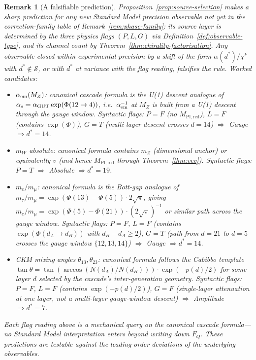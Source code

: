 \documentclass[12pt,a4paper]{article}
\newtheorem*{remark}{Remark}
\begin{document}
\begin{remark}[A falsifiable prediction]\label{rem:selection-falsifier}
Proposition~\ref{prop:source-selection} makes a sharp prediction for any new Standard Model precision observable not yet in the correction-family table of Remark~\ref{rem:phase-family}: its source layer is determined by the three physics flags $(P,L,G)$ via Definition~\ref{def:observable-type}, and its channel count by Theorem~\ref{thm:chirality-factorisation}. Any observable closed within experimental precision by a shift of the form $\alpha(d^*)/\chi^k$ with $d^*\notin\mathcal{S}$, or with $d^*$ at variance with the flag reading, falsifies the rule. Worked candidates:
\begin{itemize}
\item $\alpha_{\rm em}(M_Z)$: canonical cascade formula is the U(1)
descent analogue of $\alpha_s = \alpha_{\rm GUT}\exp(\Phi(12\to 4))$,
i.e.\ $\alpha_{\rm em}^{-1}$ at $M_Z$ is built from a U(1) descent
through the gauge window. Syntactic flags: $P = F$ (no
$M_{\mathrm{Pl,red}}$), $L = F$ (contains $\exp(\Phi)$),
$G = T$ (multi-layer descent crosses $d=14$) $\Rightarrow$ Gauge
$\Rightarrow d^* = 14$.
\item $m_W$ absolute: canonical formula contains $m_Z$ (dimensional
anchor) or equivalently $v$ (and hence $M_{\mathrm{Pl,red}}$ through
Theorem~\ref{thm:vev}). Syntactic flags: $P = T$ $\Rightarrow$
Absolute $\Rightarrow d^* = 19$.
\item $m_e/m_\mu$: canonical formula is the Bott-gap analogue of
$m_\tau/m_\mu = \exp(\Phi(13)-\Phi(5))\cdot 2\sqrt{\pi}$, giving
$m_e/m_\mu = \exp(\Phi(5)-\Phi(21))\cdot (2\sqrt{\pi})^{-1}$ or
similar path across the gauge window. Syntactic flags: $P = F$,
$L = F$ (contains $\exp(\Phi(d_A\to d_B))$ with $d_B - d_A \geq 2$),
$G = T$ (path from $d=21$ to $d=5$ crosses the gauge window
$\{12,13,14\}$) $\Rightarrow$ Gauge $\Rightarrow d^* = 14$.
\item CKM mixing angles $\theta_{13},\theta_{23}$: canonical formula
follows the Cabibbo template $\tan\theta =
\tan(\arccos(N(d_A)/N(d_B)))\cdot\exp(-p(d)/2)$ for some layer $d$
selected by the cascade's inter-generation geometry. Syntactic flags:
$P = F$, $L = F$ (contains $\exp(-p(d)/2)$), $G = F$
(single-layer attenuation at one layer, not a multi-layer gauge-window
descent) $\Rightarrow$ Amplitude $\Rightarrow d^* = 7$.
\end{itemize}
Each flag reading above is a mechanical query on the canonical
cascade formula---no Standard Model interpretation enters beyond
writing down $F_Q$. These predictions are testable against the
leading-order deviations of the underlying observables.
\end{remark}
\end{document}
